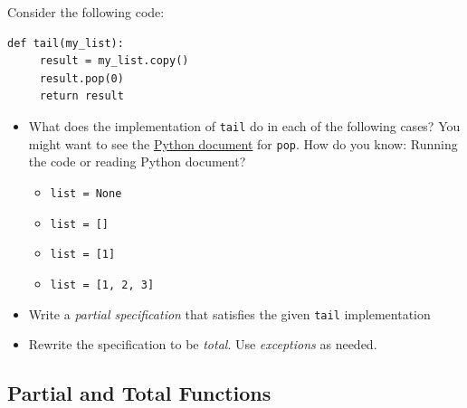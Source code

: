 \documentclass[oneside,11pt,dvipsnames]{book}
\newcommand{\code}[1]{\texttt{#1}}
\begin{document}
Consider the following code:

\begin{lstlisting}
def tail(my_list):
     result = my_list.copy()
     result.pop(0)
     return result
\end{lstlisting}

\begin{itemize}
     \item What does the implementation of \code{tail} do in each of the following cases? You might want to see the \href{https://docs.python.org/3/tutorial/datastructures.html}{Python document} for \code{pop}.  How do you know: Running the code or reading Python document?
     \begin{itemize}
         \item \code{list = None}
         \item \code{list = []}
         \item \code{list = [1]}  
         \item \code{list = [1, 2, 3]}
     \end{itemize}
     \item Write a \emph{partial specification} that satisfies the given \code{tail} implementation
     \item Rewrite the specification to be \emph{total}. Use \emph{exceptions} as needed.
    \end{itemize}

\subsection{Partial and Total Functions}\label{exercise:partial-total}
\end{document}
